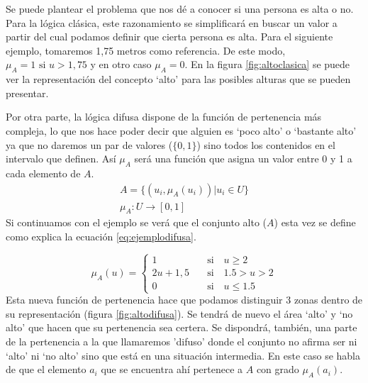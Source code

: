 Se puede plantear el problema que nos dé a conocer si una persona es alta o no. Para la lógica clásica, este razonamiento se simplificará en buscar un valor a partir del cual podamos definir que cierta persona es alta. Para el siguiente ejemplo, tomaremos 1,75 metros como referencia. De este modo, $\mu_{A}=1 \text{ si } u>1,75$ y en otro caso $\mu_{A}=0$. En la figura \ref{fig:altoclasica} se puede ver la representación del concepto `alto' para las posibles alturas que se pueden presentar.



Por otra parte, la lógica difusa dispone de la función de pertenencia más compleja, lo que nos hace poder decir que alguien es `poco alto' o `bastante alto' ya que no daremos un par de valores ($\{0,1\}$) sino todos los contenidos en el intervalo que definen. Así $\mu_{A}$ será una función que asigna un valor entre 0 y 1 a cada elemento de $A$.\begin{equation}\label{eq:logicadifusa}
\begin{aligned} 
	A = \{(u_{i}, \mu_{A}(u_{i})) | u_{i}\in U\}\\
	\mu_{A}:U\rightarrow [0,1]
\end{aligned}
\end{equation}                
Si continuamos con el ejemplo se verá que el conjunto alto ($A$) esta vez se define como explica la ecuación \ref{eq:ejemplodifusa}. 

\begin{equation}\label{eq:ejemplodifusa}                
	\mu_{A}(u) = \left\{ \begin{aligned}
		1 \quad&\text{si}\quad u\geq 2\\
		2u + 1,5 \quad&\text{si}\quad 1.5>u>2\\
		0 \quad&\text{si}\quad u\leq 1.5
 	\end{aligned}\right.
 \end{equation}           
Esta nueva función de pertenencia hace que podamos distinguir 3 zonas dentro de su representación (figura \ref{fig:altodifusa}). Se tendrá de nuevo el área `alto' y `no alto' que hacen que su pertenencia sea certera. Se dispondrá, también, una parte de la pertenencia a la que llamaremos 'difuso' donde el conjunto no afirma ser ni `alto' ni `no alto' sino que está en una situación intermedia. En este caso se habla de que el elemento $a_{i}$ que se encuentra ahí pertenece a $A$ con grado $\mu_{A}(a_{i})$.
                


